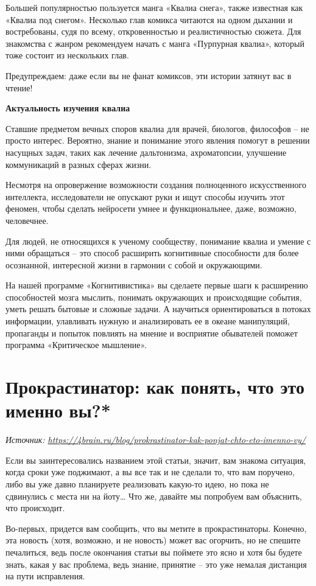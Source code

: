 Большей популярностью пользуется манга «Квалиа снега», также известная как «Квалиа под снегом». Несколько глав комикса читаются на одном дыхании и востребованы, судя по всему, откровенностью и реалистичностью сюжета. Для знакомства с жанром рекомендуем начать с манга «Пурпурная квалиа», который тоже состоит из нескольких глав.

Предупреждаем: даже если вы не фанат комиксов, эти истории затянут вас в чтение!

\textbf{Актуальность изучения квалиа}

Ставшие предметом вечных споров квалиа для врачей, биологов, философов – не просто интерес. Вероятно, знание и понимание этого явления помогут в решении насущных задач, таких как лечение дальтонизма, ахроматопсии, улучшение коммуникаций в разных сферах жизни.

Несмотря на опровержение возможности создания полноценного искусственного интеллекта, исследователи не опускают руки и ищут способы изучить этот феномен, чтобы сделать нейросети умнее и функциональнее, даже, возможно, человечнее.

Для людей, не относящихся к ученому сообществу, понимание квалиа и умение с ними обращаться – это способ расширить когнитивные способности для более осознанной, интересной жизни в гармонии с собой и окружающими.

На нашей программе «Когнитивистика» вы сделаете первые шаги к расширению способностей мозга мыслить, понимать окружающих и происходящие события, уметь решать бытовые и сложные задачи. А научиться ориентироваться в потоках информации, улавливать нужную и анализировать ее в океане манипуляций, пропаганды и попыток повлиять на мнение и восприятие обывателей поможет программа «Критическое мышление».


\newpage
\section{Прокрастинатор: как понять, что это именно вы?*}

\textit{Источник: \url{https://4brain.ru/blog/prokrastinator-kak-ponjat-chto-eto-imenno-vy/}}

Если вы заинтересовались названием этой статьи, значит, вам знакома ситуация, когда сроки уже поджимают, а вы все так и не сделали то, что вам поручено, либо вы уже давно планируете реализовать какую-то идею, но пока не сдвинулись с места ни на йоту… Что же, давайте мы попробуем вам объяснить, что происходит.

Во-первых, придется вам сообщить, что вы метите в прокрастинаторы. Конечно, эта новость (хотя, возможно, и не новость) может вас огорчить, но не спешите печалиться, ведь после окончания статьи вы поймете это ясно и хотя бы будете знать, какая у вас проблема, ведь знание, принятие – это уже немалая дистанция на пути исправления.

